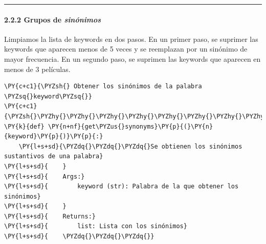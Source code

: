     \begin{center}\rule{0.5\linewidth}{\linethickness}\end{center}

\paragraph{\texorpdfstring{2.2.2 Grupos de
\emph{sinónimos}}{2.2.2 Grupos de sinónimos}}\label{grupos-de-sinuxf3nimos}

Limpiamos la lista de keywords en dos pasos. En un primer paso, se
suprimer las keywords que aparecen menos de 5 veces y se reemplazan por
un sinónimo de mayor frecuencia. En un segundo paso, se suprimen las
keywords que aparecen en menos de 3 películas.

    \begin{tcolorbox}[breakable, size=fbox, boxrule=1pt, pad at break*=1mm,colback=cellbackground, colframe=cellborder]
\begin{Verbatim}[commandchars=\\\{\}]
\PY{c+c1}{\PYZsh{} Obtener los sinónimos de la palabra \PYZsq{}keyword\PYZsq{}}
\PY{c+c1}{\PYZsh{}\PYZhy{}\PYZhy{}\PYZhy{}\PYZhy{}\PYZhy{}\PYZhy{}\PYZhy{}\PYZhy{}\PYZhy{}\PYZhy{}\PYZhy{}\PYZhy{}\PYZhy{}\PYZhy{}\PYZhy{}\PYZhy{}\PYZhy{}\PYZhy{}\PYZhy{}\PYZhy{}\PYZhy{}\PYZhy{}\PYZhy{}\PYZhy{}\PYZhy{}\PYZhy{}\PYZhy{}\PYZhy{}\PYZhy{}\PYZhy{}\PYZhy{}\PYZhy{}\PYZhy{}\PYZhy{}\PYZhy{}\PYZhy{}\PYZhy{}\PYZhy{}\PYZhy{}\PYZhy{}\PYZhy{}\PYZhy{}\PYZhy{}\PYZhy{}\PYZhy{}\PYZhy{}\PYZhy{}\PYZhy{}\PYZhy{}\PYZhy{}\PYZhy{}\PYZhy{}\PYZhy{}\PYZhy{}\PYZhy{}\PYZhy{}\PYZhy{}\PYZhy{}\PYZhy{}\PYZhy{}\PYZhy{}\PYZhy{}}
\PY{k}{def} \PY{n+nf}{get\PYZus{}synonyms}\PY{p}{(}\PY{n}{keyword}\PY{p}{)}\PY{p}{:}
    \PY{l+s+sd}{\PYZdq{}\PYZdq{}\PYZdq{}Se obtienen los sinónimos sustantivos de una palabra}
\PY{l+s+sd}{    }
\PY{l+s+sd}{    Args:}
\PY{l+s+sd}{        keyword (str): Palabra de la que obtener los sinónimos}
\PY{l+s+sd}{    }
\PY{l+s+sd}{    Returns:}
\PY{l+s+sd}{        list: Lista con los sinónimos}
\PY{l+s+sd}{    \PYZdq{}\PYZdq{}\PYZdq{}}


\end{Verbatim}
\end{tcolorbox}
